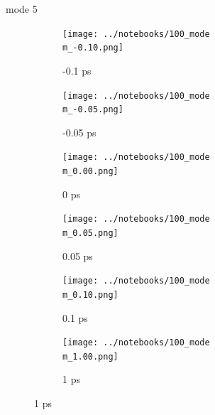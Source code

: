 \documentclass{beamer}
\begin{document}
\renewcommand\m{5}
\begin{frame}{mode \m}
	\begin{figure}
		\centering
		\begin{subfigure}[b]{\w\textwidth}
			\centering
			\texttt{[image: ../notebooks/100\_mode\\m\_-0.10.png]}
			\caption{-0.1 ps}
		\end{subfigure}
		\begin{subfigure}[b]{\w\textwidth}
			\centering
			\texttt{[image: ../notebooks/100\_mode\\m\_-0.05.png]}
			\caption{-0.05 ps}
		\end{subfigure}
		\begin{subfigure}[b]{\w\textwidth}
			\centering
			\texttt{[image: ../notebooks/100\_mode\\m\_0.00.png]}
			\caption{0 ps}
		\end{subfigure}
		\begin{subfigure}[b]{\w\textwidth}
			\centering
			\texttt{[image: ../notebooks/100\_mode\\m\_0.05.png]}
			\caption{0.05 ps}
		\end{subfigure}
		\begin{subfigure}[b]{\w\textwidth}
			\centering
			\texttt{[image: ../notebooks/100\_mode\\m\_0.10.png]}
			\caption{0.1 ps}
		\end{subfigure}
		\begin{subfigure}[b]{\w\textwidth}
			\centering
			\texttt{[image: ../notebooks/100\_mode\\m\_1.00.png]}
			\caption{1 ps}
		\end{subfigure}
	\end{figure}
\end{frame}
\end{document}
